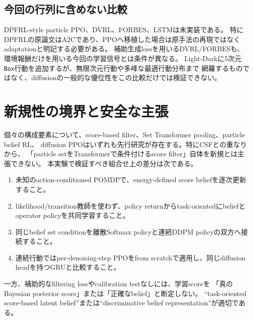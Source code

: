 \documentclass[a4paper,11pt]{article}
\begin{document}
\subsection{今回の行列に含めない比較}

DPFRL-style particle PPO、DVRL、FORBES、LSTMは未実装である。
特にDPFRLの原論文はA2Cであり、PPOへ移植した場合は原手法の再現ではなくadaptationと明記する必要がある。
補助生成lossを用いるDVRL/FORBESも、環境報酬だけを用いる今回の学習信号とは条件が異なる。
Light-Darkに5次元\texttt{Box}行動を追加するが、無限次元行動や多峰な最適行動分布まで
網羅するものではなく、diffusionの一般的な優位性をこの比較だけでは検証できない。

\section{新規性の境界と安全な主張}

個々の構成要素について、score-based filter、Set Transformer pooling、particle belief RL、
diffusion PPOはいずれも先行研究が存在する。特にCSF\cite{zeng2025csf}との重なりから、
「particle setをTransformerで条件付けるscore filter」自体を新規とは主張できない。
本実験で検証すべき組合せ上の差分は次である。
\begin{enumerate}
  \item 未知のaction-conditioned POMDPで、energy-defined score beliefを逐次更新すること。
  \item likelihood/transition教師を使わず、policy returnからtask-orientedにbeliefとoperator policyを共同学習すること。
  \item 同じbelief set conditionを離散Softmax policyと連続DDPM policyの双方へ接続すること。
  \item 連続行動ではper-denoising-step PPOをfrom scratchで適用し、同じdiffusion headを持つGRUと比較すること。
\end{enumerate}
一方、補助的なfiltering lossやcalibration testなしには、学習scoreを
「真のBayesian posterior score」または「正確なbelief」と断定しない。
``task-oriented score-based latent belief''または``discriminative belief representation''が適切である。
\end{document}
